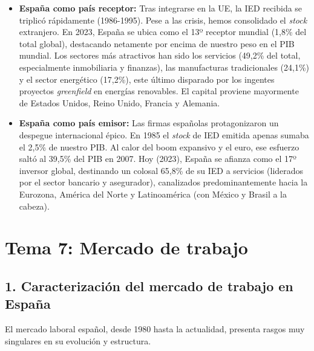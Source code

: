 \begin{itemize}
  \item \textbf{España como país receptor:} Tras integrarse en la UE, la IED recibida se triplicó rápidamente (1986-1995). Pese a las crisis, hemos consolidado el \textit{stock} extranjero. En 2023, España se ubica como el 13º receptor mundial (1,8\% del total global), destacando netamente por encima de nuestro peso en el PIB mundial. Los sectores más atractivos han sido los servicios (49,2\% del total, especialmente inmobiliaria y finanzas), las manufacturas tradicionales (24,1\%) y el sector energético (17,2\%), este último disparado por los ingentes proyectos \textit{greenfield} en energías renovables. El capital proviene mayormente de Estados Unidos, Reino Unido, Francia y Alemania.
  \item \textbf{España como país emisor:} Las firmas españolas protagonizaron un despegue internacional épico. En 1985 el \textit{stock} de IED emitida apenas sumaba el 2,5\% de nuestro PIB. Al calor del boom expansivo y el euro, ese esfuerzo saltó al 39,5\% del PIB en 2007. Hoy (2023), España se afianza como el 17º inversor global, destinando un colosal 65,8\% de su IED a servicios (liderados por el sector bancario y asegurador), canalizados predominantemente hacia la Eurozona, América del Norte y Latinoamérica (con México y Brasil a la cabeza).
\end{itemize}


\clearpage

\section*{Tema 7: Mercado de trabajo}

\bigskip
\subsection*{1. Caracterización del mercado de trabajo en España}

El mercado laboral español, desde 1980 hasta la actualidad, presenta rasgos muy singulares en su evolución y estructura.

